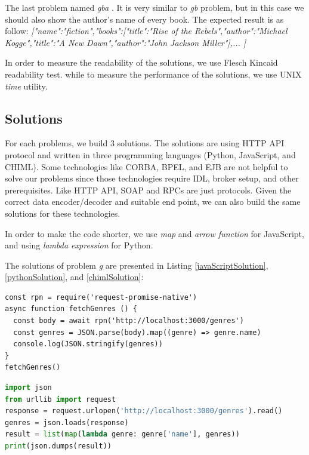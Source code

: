 \documentclass[conference]{IEEEtran}
\begin{document}
The last problem named {\it gba }. It is very similar to {\it gb } problem, but in this case we should also show the author's name of every book. The expected result is as follow: 
{\it [{"name":"fiction","books":[{"title":"Rise of the Rebels","author":"Michael Kogge"},{"title":"A New Dawn","author":"John Jackson Miller"}]},... ]}

In order to measure the readability of the solutions, we use Flesch Kincaid readability test. while to measure the performance of the solutions, we use UNIX {\it time} utility.

\subsection{Solutions}

For each problems, we build 3 solutions. The solutions are using HTTP API protocol and written in three programming languages (Python, JavaScript, and CHIML). Some technologies like CORBA, BPEL, and EJB are not helpful to solve our problems since those technologies require IDL, broker setup, and other prerequisites. Like HTTP API, SOAP and RPCs are just protocols. Given the correct data encoder/decoder and suitable end point, we can also build the same solutions for these technologies.

In order to make the code shorter, we use {\it map} and {\it arrow function} for JavaScript, and using {\it lambda expression} for Python.

The solutions of problem {\it g} are presented in Listing \ref{javaScriptSolution}, \ref{pythonSolution}, and \ref{chimlSolution}:

\begin{lstlisting}[caption=JavaScript Solution for problem-g, label=javaScriptSolution, basicstyle=\footnotesize, breaklines=true]
const rpn = require('request-promise-native')
async function fetchGenres () {
  const body = await rpn('http://localhost:3000/genres')
  const genres = JSON.parse(body).map((genre) => genre.name)
  console.log(JSON.stringify(genres))
}
fetchGenres()
\end{lstlisting}

\begin{lstlisting}[caption=Python Solution for problem-g, label=pythonSolution, basicstyle=\footnotesize, breaklines=true, language=python]
import json
from urllib import request
response = request.urlopen('http://localhost:3000/genres').read()
genres = json.loads(response)
result = list(map(lambda genre: genre['name'], genres))
print(json.dumps(result))
\end{lstlisting}
\end{document}
